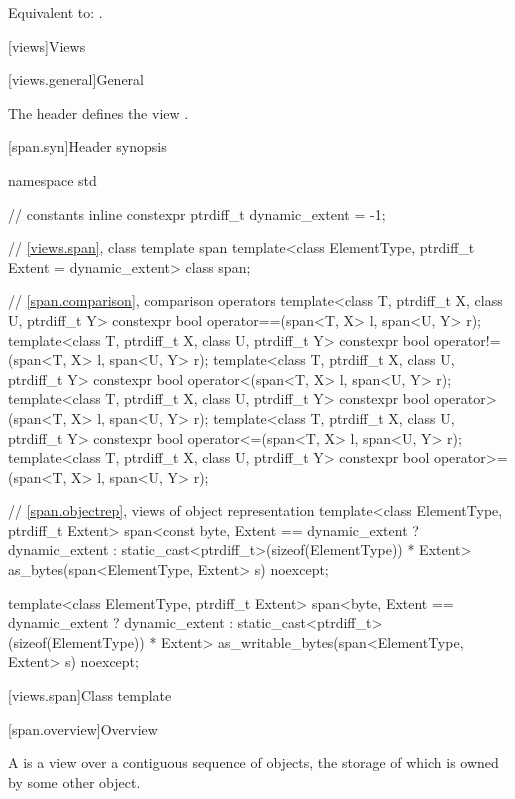\begin{codeblock}
\begin{codeblock}
\begin{codeblock}
\begin{addedblock}
\begin{itemdescr}
\pnum
\effects Equivalent to: .
\end{itemdescr}
\end{addedblock}

[views]{Views}

[views.general]{General}

\pnum
The header  defines the view .

[span.syn]{Header  synopsis}%
%

\begin{codeblock}
namespace std {
  // constants
  inline constexpr ptrdiff_t dynamic_extent = -1;

  // \ref{views.span}, class template span
  template<class ElementType, ptrdiff_t Extent = dynamic_extent>
    class span;

  // \ref{span.comparison}, comparison operators
  template<class T, ptrdiff_t X, class U, ptrdiff_t Y>
    constexpr bool operator==(span<T, X> l, span<U, Y> r);
  template<class T, ptrdiff_t X, class U, ptrdiff_t Y>
    constexpr bool operator!=(span<T, X> l, span<U, Y> r);
  template<class T, ptrdiff_t X, class U, ptrdiff_t Y>
    constexpr bool operator<(span<T, X> l, span<U, Y> r);
  template<class T, ptrdiff_t X, class U, ptrdiff_t Y>
    constexpr bool operator>(span<T, X> l, span<U, Y> r);
  template<class T, ptrdiff_t X, class U, ptrdiff_t Y>
    constexpr bool operator<=(span<T, X> l, span<U, Y> r);
  template<class T, ptrdiff_t X, class U, ptrdiff_t Y>
    constexpr bool operator>=(span<T, X> l, span<U, Y> r);

  // \ref{span.objectrep}, views of object representation
  template<class ElementType, ptrdiff_t Extent>
    span<const byte,
         Extent == dynamic_extent ? dynamic_extent
                                  : static_cast<ptrdiff_t>(sizeof(ElementType)) * Extent>
      as_bytes(span<ElementType, Extent> s) noexcept;

  template<class ElementType, ptrdiff_t Extent>
    span<byte,
         Extent == dynamic_extent ? dynamic_extent
                                  : static_cast<ptrdiff_t>(sizeof(ElementType)) * Extent>
      as_writable_bytes(span<ElementType, Extent> s) noexcept;
}
\end{codeblock}

[views.span]{Class template }

[span.overview]{Overview}

\pnum
{}%
A  is a view over a contiguous sequence of objects,
the storage of which is owned by some other object.


\end{codeblock}
\end{codeblock}
\end{codeblock}

